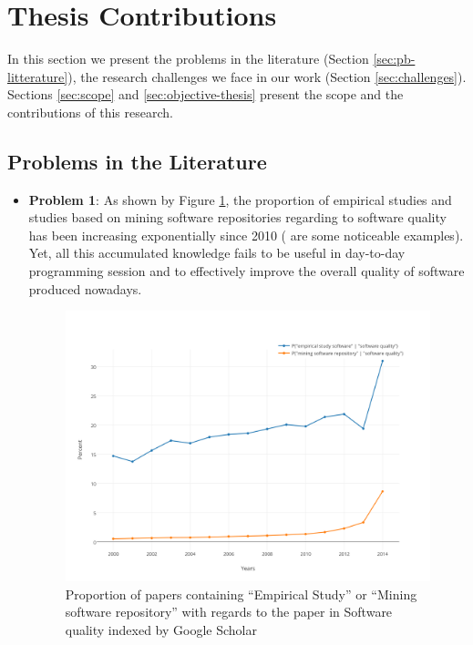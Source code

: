 \section{Thesis Contributions}


In this section we present the problems in the literature (Section \ref{sec:pb-litterature}), the research challenges we face in our work (Section \ref{sec:challenges}). Sections \ref{sec:scope} and \ref{sec:objective-thesis} present the scope and the contributions of this research.

\subsection{Problems in the Literature\label{sec:pb-litterature}}

\begin{itemize}
	\item {\bf Problem 1}: As shown by Figure \ref{fig:scholar}, the proportion of empirical studies and studies based on mining software repositories regarding to software quality has been increasing exponentially since 2010 (\cite{Kim2011a,Lee2011a,Sun2011,Bhattacharya2011,Tian2012a,Zimmermann2012, Shang2013, Chen2014, McIntosh, Hemmati2015} are some noticeable examples).
	Yet, all this accumulated knowledge fails to be useful in day-to-day programming session and to effectively improve the overall quality of software produced nowadays.

	\begin{figure}[h!]
	  \centering
	  	    \includegraphics[scale=0.7]{media/scholar.png}
	    \caption{Proportion of papers containing ``Empirical Study'' or ``Mining software repository'' with regards to the paper in Software quality indexed by Google Scholar	\label{fig:scholar}}
	\end{figure}


\end{itemize}
